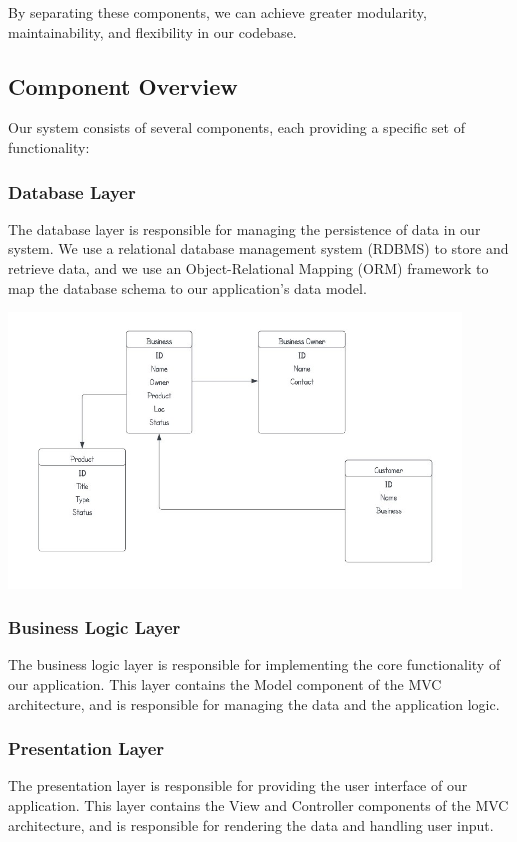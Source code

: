 \documentclass{article}
\begin{document}
By separating these components, we can achieve greater modularity, maintainability, and flexibility in our codebase.

\subsection{Component Overview}

Our system consists of several components, each providing a specific set of functionality:

\subsubsection{Database Layer}

The database layer is responsible for managing the persistence of data in our system. We use a relational database management system (RDBMS) to store and retrieve data, and we use an Object-Relational Mapping (ORM) framework to map the database schema to our application's data model.


\includegraphics[width=0.9\textwidth]{db_schema.jpg}
\subsubsection{Business Logic Layer}

The business logic layer is responsible for implementing the core functionality of our application. This layer contains the Model component of the MVC architecture, and is responsible for managing the data and the application logic.

\subsubsection{Presentation Layer}

The presentation layer is responsible for providing the user interface of our application. This layer contains the View and Controller components of the MVC architecture, and is responsible for rendering the data and handling user input.
\end{document}
